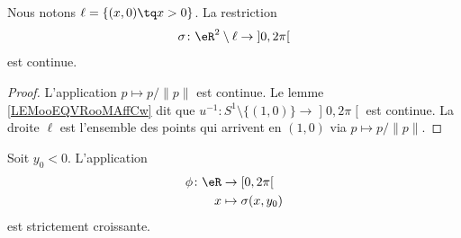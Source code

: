 \begin{proposition}	\label{PROPooHZFQooRwGKYG}
	Nous notons \( \ell=\{ (x,0)\tq x>0 \}\). La restriction
	\begin{equation}
		\sigma \colon \eR^2\setminus \ell\to \mathopen] 0,2\pi\mathclose[
	\end{equation}
	est continue.
\end{proposition}

\begin{proof}
	L'application \( p\mapsto p/\| p \|\) est continue. Le lemme \ref{LEMooEQVRooMAffCw} dit que \(u^{-1} \colon S^1\setminus\{ (1,0) \}\to \mathopen] 0,2\pi\mathclose[  \) est continue. La droite \( \ell\) est l'ensemble des points qui arrivent en \( (1,0)\) via \( p\mapsto p/\| p \|\).
\end{proof}

\begin{proposition}	\label{PROPooZJQAooIksTzb}
	Soit \( y_0<0\). L'application
	\begin{equation}
		\begin{aligned}
			\phi\colon \eR & \to  \mathopen[ 0,2\pi\mathclose[ \\
			x              & \mapsto \sigma(x,y_0)
		\end{aligned}
	\end{equation}
	est strictement croissante.
\end{proposition}

